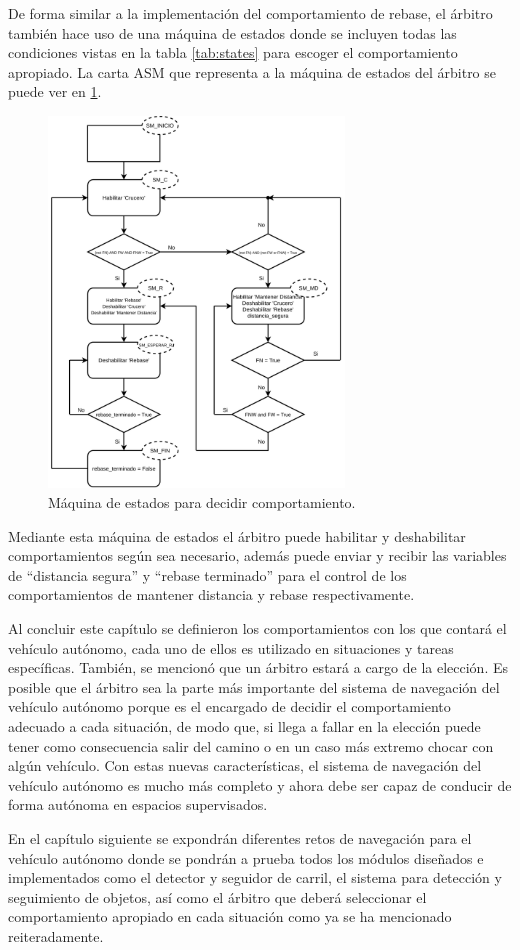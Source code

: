 De forma similar a la implementación del comportamiento de rebase, el árbitro también hace uso de una máquina de estados donde se incluyen todas las condiciones vistas en la tabla \ref{tab:states} para escoger el comportamiento apropiado. La carta ASM que representa a la máquina de estados del árbitro se puede ver en \ref{fig:main_sm}.
\begin{figure}[h]
    \centering
    \includegraphics[width=0.7\textwidth]{Figures/Figures_Cap06/main_sm.pdf}
    \caption{Máquina de estados para decidir comportamiento.}
    \label{fig:main_sm}
\end{figure}

Mediante esta máquina de estados el árbitro puede habilitar y deshabilitar comportamientos según sea necesario, además puede enviar y recibir las variables de ``distancia segura'' y ``rebase terminado'' para el control de los comportamientos de mantener distancia y rebase respectivamente. 

Al concluir este capítulo se definieron los comportamientos con los que contará el vehículo autónomo, cada uno de ellos es utilizado en situaciones y tareas específicas. También, se mencionó que un árbitro estará a cargo de la elección. Es posible que el árbitro sea la parte más importante del sistema de navegación del vehículo autónomo porque es el encargado de decidir el comportamiento adecuado a cada situación, de modo que, si llega a fallar en la elección puede tener como consecuencia salir del camino o en un caso más extremo chocar con algún vehículo. Con estas nuevas características, el sistema de navegación del vehículo autónomo es mucho más completo y ahora debe ser capaz de conducir de forma autónoma en espacios supervisados. 

En el capítulo siguiente se expondrán diferentes retos de navegación para el vehículo autónomo donde se pondrán a prueba todos los módulos diseñados e implementados como el detector y seguidor de carril, el sistema para detección y seguimiento de objetos, así como el árbitro que deberá seleccionar el comportamiento apropiado en cada situación como ya se ha mencionado reiteradamente.

